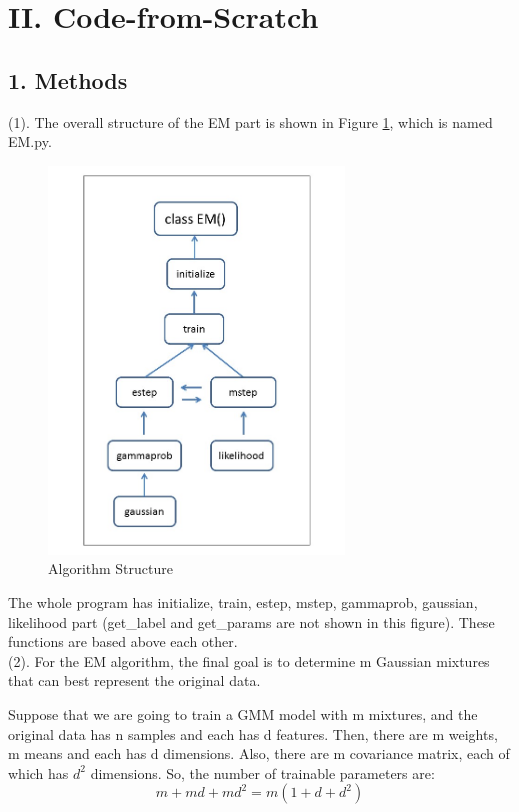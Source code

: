 \newpage
\section*{\Large II. Code-from-Scratch}

\subsection*{\large 1. Methods}

(1). The overall structure of the EM part is shown in Figure \ref{fig:structure}, which is named EM.py.

\begin{figure}[H]
\centering
\includegraphics[width=0.7\textwidth]{./figures/ECE544hw3.jpg}
\caption{\label{fig:structure} Algorithm Structure}
\end{figure}

The whole program has initialize, train, estep, mstep, gammaprob, gaussian, likelihood part (get\_label and get\_params are not shown in this figure). These functions are based above each other.\\

(2). For the EM algorithm, the final goal is to determine m Gaussian mixtures that can best represent the original data.

Suppose that we are going to train a GMM model with m mixtures, and the original data has n samples and each has d features. Then, there are m weights, m means and each has d dimensions. Also, there are m covariance matrix, each of which has $d^2$ dimensions. So, the number of trainable parameters are:
$$ m + m d + m d^2 = m (1 + d + d^2)$$

